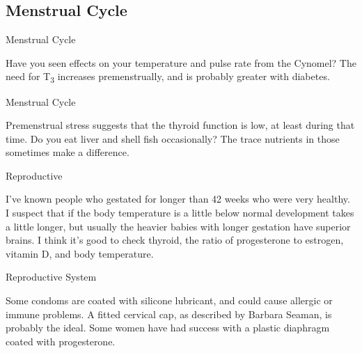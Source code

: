 \documentclass[11pt,oneside,openany,extrafontsizes]{memoir}
\begin{document}
\subsection{Menstrual Cycle}

\begin{standalonequote}{Menstrual Cycle}

    \begin{answer}
        Have you seen effects on your temperature and pulse rate from the Cynomel? The need for T\textsubscript{3} increases premenstrually, and is probably greater with diabetes.
    \end{answer}
\end{standalonequote}

\begin{standalonequote}{Menstrual Cycle}

    \begin{answer}
        Premenstrual stress suggests that the thyroid function is low, at least during that time. Do you eat liver and shell fish occasionally? The trace nutrients in those sometimes make a difference.
    \end{answer}
\end{standalonequote}

\begin{standalonequote}{Reproductive}

    \begin{answer}
        I've known people who gestated for longer than 42 weeks who were very healthy. I suspect that if the body temperature is a little below normal development takes a little longer, but usually the heavier babies with longer gestation have superior brains. I think it's good to check thyroid, the ratio of progesterone to estrogen, vitamin D, and body temperature.
    \end{answer}
\end{standalonequote}

\begin{standalonequote}{Reproductive System}

    \begin{answer}
      Some condoms are coated with silicone lubricant, and could cause allergic or immune problems. A fitted cervical cap, as described by Barbara Seaman, is probably the ideal. Some women have had success with a plastic diaphragm coated with progesterone.
    \end{answer}
\end{standalonequote}
\end{document}
